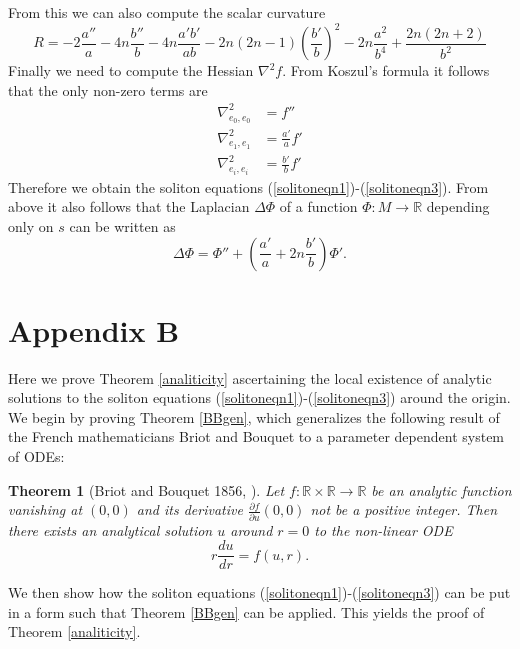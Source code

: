 \documentclass{amsart}
\newtheorem{thm}{Theorem}[section]
\theoremstyle{definition}
\theoremstyle{remark}
\numberwithin{equation}{section}
\newcommand{\R}{\mathbb{R}}  %
\begin{document}
From this we can also compute the scalar curvature
\begin{equation}
\label{scalarcurvature}
R = -2 \frac{a''}{a} - 4n \frac{b''}{b} - 4n \frac{a'b'}{ab} - 2n(2n-1)\left(\frac{b'}{b}\right)^2 - 2n \frac{a^2}{b^4} + \frac{2n(2n+2)}{b^2}
\end{equation}
Finally we need to compute the Hessian $\nabla^2f$. From Koszul's formula it follows that the only non-zero terms are
\begin{align*}
\nabla^2_{e_0,e_0} &= f'' \\
\nabla^2_{e_1,e_1} &= \frac{a'}{a}f' \\
\nabla^2_{e_i,e_i} &= \frac{b'}{b}f'
\end{align*}
Therefore we obtain the soliton equations (\ref{solitoneqn1})-(\ref{solitoneqn3}). From above it also follows that the Laplacian $\Delta \Phi$ of a function $\Phi: M \rightarrow \R$ depending only on $s$ can be written as
\begin{equation}
\label{laplacian}
\Delta \Phi = \Phi'' + \left(\frac{a'}{a}+ 2n \frac{b'}{b}\right)\Phi'.
\end{equation}
\section*{Appendix B}
Here we prove Theorem \ref{analiticity} ascertaining the local existence of analytic solutions to the soliton equations (\ref{solitoneqn1})-(\ref{solitoneqn3}) around the origin. We begin by proving Theorem \ref{BBgen}, which generalizes the following result of the French mathematicians Briot and Bouquet to a parameter dependent system of ODEs:
\begin{thm}[Briot and Bouquet 1856, \cite{BB1856}]
Let $f: \R\times\R \rightarrow \R$ be an analytic function vanishing at $(0,0)$ and its derivative $\frac{\partial f}{\partial u}(0,0)$ not be a positive integer. Then there exists an  analytical solution $u$ around $r=0$ to the non-linear ODE
\begin{equation*}
r\frac{du}{dr} = f(u,r).
\end{equation*}
\end{thm}
We then show how the soliton equations (\ref{solitoneqn1})-(\ref{solitoneqn3}) can be put in a form such that Theorem \ref{BBgen} can be applied. This yields the proof of Theorem \ref{analiticity}. 
\end{document}
